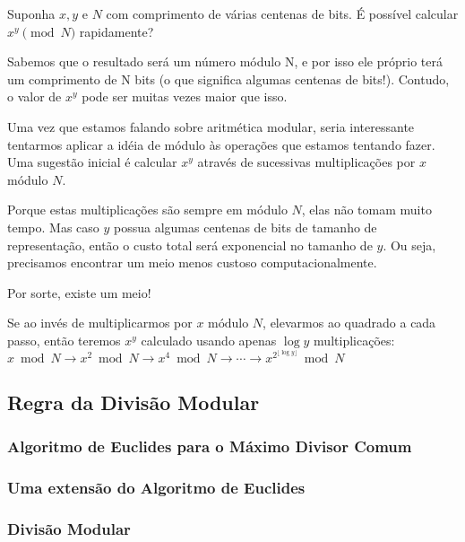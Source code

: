 Suponha $x, y \textrm{ e } N$ com comprimento de várias centenas de bits. É
possível calcular $x^y \pmod N$ rapidamente?

Sabemos que o resultado será um número módulo N, e por isso ele próprio terá
um comprimento de N bits (o que significa algumas centenas de bits!). Contudo,
o valor de $x^y$ pode ser muitas vezes maior que isso.

Uma vez que estamos falando sobre aritmética modular, seria interessante
tentarmos aplicar a idéia de módulo às operações que estamos tentando fazer.
Uma sugestão inicial é calcular $x^y$ através de sucessivas multiplicações por
$x$ módulo $N$.

Porque estas multiplicações são sempre em módulo $N$, elas não tomam muito
tempo. Mas caso $y$ possua algumas centenas de bits de tamanho de
representação, então o custo total será exponencial no tamanho de $y$. Ou
seja, precisamos encontrar um meio menos custoso computacionalmente.

Por sorte, existe um meio!

Se ao invés de multiplicarmos por $x \textrm{ módulo } N$, elevarmos ao quadrado a
cada passo, então teremos $x^y$ calculado usando apenas $\log y$
multiplicações:\\

$x \bmod N \to x^2 \bmod N \to x^4 \bmod N \to\cdots\to x^{2^{\lfloor\log
y\rfloor}} \bmod N$

\vspace{1.5em}
\subsection*{Regra da Divisão Modular}

\vspace{1.3em}
\subsubsection*{Algoritmo de Euclides para o Máximo Divisor Comum}

\vspace{1.3em}
\subsubsection*{Uma extensão do Algoritmo de Euclides}

\vspace{1.3em}
\subsubsection*{Divisão Modular}
